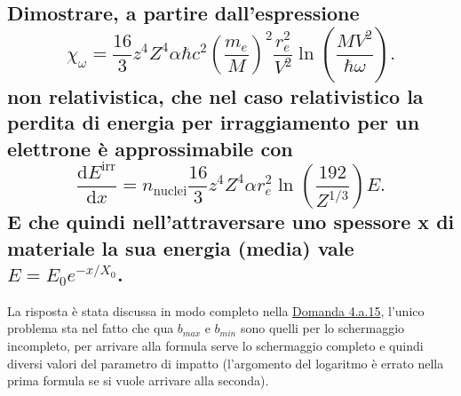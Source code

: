 \subsection[]{Dimostrare, a partire dall'espressione 
\[
	\chi_{\omega}=\frac{16}{3}z^4Z^4\alpha \hbar c^2\left( \frac{m_e}{M} \right)^2 \frac{r_e^2}{V^2} \ln\left( \frac{MV^2}{\hbar \omega} \right) 
.\] 
non relativistica, che nel caso relativistico la perdita di energia per irraggiamento per un elettrone è approssimabile con \[
	\frac{\mbox{d} E^{\text{irr}}}{\mbox{d} x} = n_{\text{nuclei}}\frac{16}{3}z^4Z^4\alpha r_e^2\ln\left( \frac{192}{Z^{1 /3}} \right) E
.\] 
E che quindi nell'attraversare uno spessore x di materiale la sua energia (media) vale $E = E_0e^{-x /X_0}$.
}%
\label{sec:5.c.3}
La risposta è stata discussa in modo completo nella \hyperref[sec:4.a.15]{Domanda 4.a.15}, l'unico problema sta nel fatto che qua $b_{max}$ e $b_{min}$ sono quelli per lo schermaggio incompleto, per arrivare alla formula serve lo schermaggio completo e quindi diversi valori del parametro di impatto (l'argomento del logaritmo è errato nella prima formula se si vuole arrivare alla seconda).

